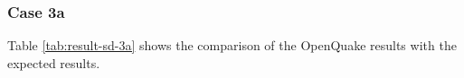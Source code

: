 \subsubsection{Case 3a}



Table \ref{tab:result-sd-3a} shows the comparison of the OpenQuake results with the expected results.